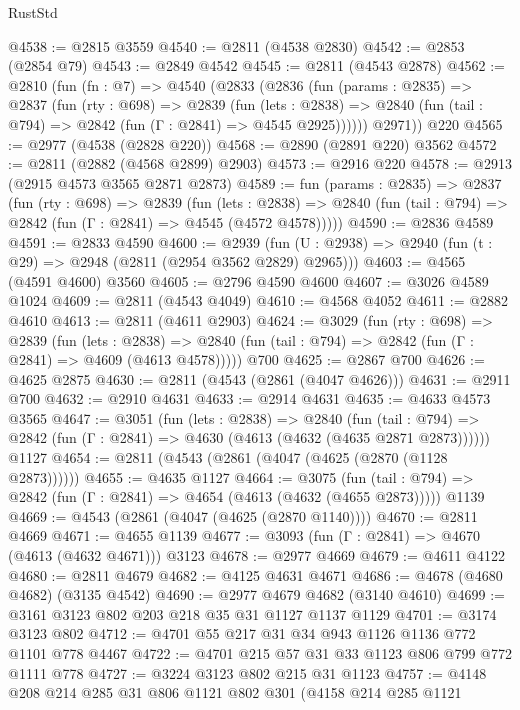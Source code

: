 \begin{lexlean}{RustStd}
\begin{coremodule}
{\begin{coremodule}
{{{{{{{{{{{{{{{@4538 := @2815 @3559
@4540 := @2811 (@4538 @2830)
@4542 := @2853 (@2854 @79)
@4543 := @2849 @4542
@4545 := @2811 (@4543 @2878)
@4562 := @2810
    (fun (fn : @7) =>
    @4540
      (@2833
        (@2836
          (fun (params : @2835) =>
          @2837
            (fun (rty : @698) =>
            @2839
              (fun (lets : @2838) =>
              @2840 (fun (tail : @794) => @2842 (fun (Γ : @2841) => @4545 @2925))))))
        @2971))
    @220
@4565 := @2977 (@4538 (@2828 @220))
@4568 := @2890 (@2891 @220) @3562
@4572 := @2811 (@2882 (@4568 @2899) @2903)
@4573 := @2916 @220
@4578 := @2913 (@2915 @4573 @3565 @2871 @2873)
@4589 := fun (params : @2835) =>
  @2837
    (fun (rty : @698) =>
    @2839
      (fun (lets : @2838) =>
      @2840 (fun (tail : @794) => @2842 (fun (Γ : @2841) => @4545 (@4572 @4578)))))
@4590 := @2836 @4589
@4591 := @2833 @4590
@4600 := @2939 (fun (U : @2938) => @2940 (fun (t : @29) => @2948 (@2811 (@2954 @3562 @2829) @2965)))
@4603 := @4565 (@4591 @4600) @3560
@4605 := @2796 @4590 @4600
@4607 := @3026 @4589 @1024
@4609 := @2811 (@4543 @4049)
@4610 := @4568 @4052
@4611 := @2882 @4610
@4613 := @2811 (@4611 @2903)
@4624 := @3029
    (fun (rty : @698) =>
    @2839
      (fun (lets : @2838) =>
      @2840 (fun (tail : @794) => @2842 (fun (Γ : @2841) => @4609 (@4613 @4578)))))
    @700
@4625 := @2867 @700
@4626 := @4625 @2875
@4630 := @2811 (@4543 (@2861 (@4047 @4626)))
@4631 := @2911 @700
@4632 := @2910 @4631
@4633 := @2914 @4631
@4635 := @4633 @4573 @3565
@4647 := @3051
    (fun (lets : @2838) =>
    @2840
      (fun (tail : @794) => @2842 (fun (Γ : @2841) => @4630 (@4613 (@4632 (@4635 @2871 @2873))))))
    @1127
@4654 := @2811 (@4543 (@2861 (@4047 (@4625 (@2870 (@1128 @2873))))))
@4655 := @4635 @1127
@4664 := @3075
    (fun (tail : @794) => @2842 (fun (Γ : @2841) => @4654 (@4613 (@4632 (@4655 @2873)))))
    @1139
@4669 := @4543 (@2861 (@4047 (@4625 (@2870 @1140))))
@4670 := @2811 @4669
@4671 := @4655 @1139
@4677 := @3093 (fun (Γ : @2841) => @4670 (@4613 (@4632 @4671))) @3123
@4678 := @2977 @4669
@4679 := @4611 @4122
@4680 := @2811 @4679
@4682 := @4125 @4631 @4671
@4686 := @4678 (@4680 @4682) (@3135 @4542)
@4690 := @2977 @4679 @4682 (@3140 @4610)
@4699 := @3161 @3123 @802 @203 @218 @35 @31 @1127 @1137 @1129
@4701 := @3174 @3123 @802
@4712 := @4701 @55 @217 @31 @34 @943 @1126 @1136 @772 @1101 @778 @4467
@4722 := @4701 @215 @57 @31 @33 @1123 @806 @799 @772 @1111 @778
@4727 := @3224 @3123 @802 @215 @31 @1123
@4757 := @4148
    @208
    @214
    @285
    @31
    @806
    @1121
    @802
    @301
    (@4158
      @214
      @285
      @1121
}}}}}}}}}}}}}}}
\end{coremodule}}
\end{coremodule}
\end{lexlean}
